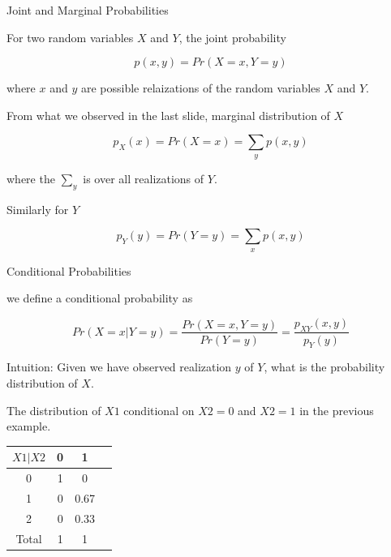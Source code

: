 \documentclass{beamer}\usepackage[]{graphicx}\usepackage[]{color}
\begin{document}
\begin{frame}[fragile]{Joint and Marginal Probabilities \;\;}

For two random variables $X$ and $Y$, the joint probability

$$ p(x,y)  = Pr(X=x, Y=y) $$

where $x$ and $y$ are possible relaizations of the random variables $X$ and $Y$. \pause \newline

From what we observed in the last slide, marginal distribution of $X$

$$ p_X(x) = Pr(X=x) = \sum_{y} p(x,y) $$

where the $\sum_{y}$ is over all realizations of $Y$. \pause \newline

Similarly for $Y$

$$ p_Y(y) = Pr(Y=y) = \sum_{x} p(x,y) $$

\end{frame}

\begin{frame}[fragile]{Conditional Probabilities \;\;}

we define a conditional probability as

$$ Pr(X=x | Y=y) = \frac{Pr(X=x, Y=y)}{Pr(Y=y)} = \frac{p_{XY}(x,y)}{p_{Y}(y)} $$

Intuition: Given we have observed realization $y$ of $Y$, what is the probability distribution of $X$. \pause \newline

The distribution of $X1$ conditional on $X2=0$ and $X2=1$ in the previous example. \pause \newline

\begin{tabular}{|c|c|c|c|}
\hline
$X1|X2$ & 0 & 1 \\ \hline
0 & 1 & 0  \\ \hline
1 & 0 & 0.67 \\ \hline
2 & 0 & 0.33 \\ \hline
Total & 1 & 1 \\ \hline
\end{tabular}

\end{frame}
\end{document}
